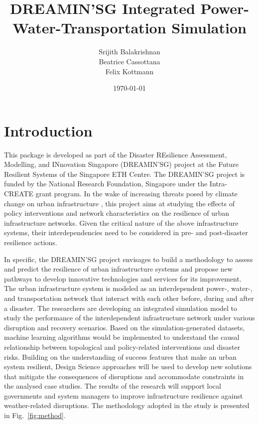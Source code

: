 \documentclass[letterpaper,12pt,english]{sphinxmanual}
\title{DREAMIN'SG Integrated Power-Water-Transportation Simulation}
\date{\today}
\author{Srijith Balakrishnan\\ Beatrice Cassottana\\ Felix Kottmann}
\begin{document}
\pagestyle{empty}
\sphinxmaketitle
\pagestyle{plain}
\sphinxtableofcontents
\pagestyle{normal}

\chapter{Introduction}
This package is developed as part of the Disaster REsilience Assessment, Modelling, and INnovation Singapore (DREAMIN’SG) project at the Future Resilient Systems of the Singapore ETH Centre. The DREAMIN'SG project is funded by the National Research Foundation, Singapore under the Intra-CREATE grant program. In the wake of increasing threats posed by climate change on urban infrastructure \cite{Nissen2017}, this project aims at studying the effects of policy interventions and network characteristics on the resilience of urban infrastructure networks. Given the critical nature of the above infrastructure systems, their interdependencies need to be considered in pre- and post-disaster resilience actions. 


In specific, the DREAMIN'SG project envisages to build a methodology to assess and predict the resilience of urban infrastructure systems and propose new pathways to develop innovative technologies and services for its improvement. The urban infrastructure system is modeled as an interdependent power-, water-, and transportation network that interact with each other before, during and after a disaster. The researchers are developing an integrated simulation model to study the performance of the interdependent infrastructure network under various disruption and recovery scenarios. Based on the simulation-generated datasets, machine learning algorithms would be implemented to understand the causal relationship between topological and policy-related interventions and disaster risks. Building on the understanding of success features that make an urban system resilient, Design Science approaches will be used to develop new solutions that mitigate the consequences of disruptions and accommodate constraints in the analysed case studies. The results of the research will support local governments and system managers to improve infrastructure resilience against weather-related disruptions. The methodology adopted in the study is presented in Fig.~\ref{fig:method}.
\end{document}
